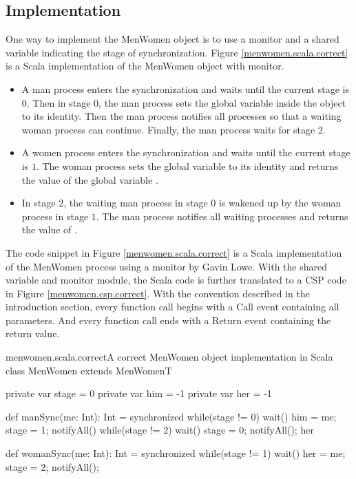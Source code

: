\documentclass{article}
\begin{document}
\subsection{Implementation}
One way to implement the MenWomen object is to use a monitor and a shared variable indicating the stage of synchronization. Figure \ref{menwomen.scala.correct} is a Scala implementation of the MenWomen object with monitor.
\begin{itemize}
  \item A man process enters the synchronization and waits until the current stage is $0$. Then in stage $0$, the man process sets the global variable  inside the  object to its identity. Then the man process notifies all processes so that a waiting woman process can continue. Finally, the man process waits for stage 2.
  \item A women process enters the synchronization and waits until the current stage is $1$. The woman process sets the global variable  to its identity and returns the value of the global variable .
  \item In stage $2$, the waiting man process in stage $0$ is wakened up by the woman process in stage $1$. The man process notifies all waiting processes and returns the value of .
\end{itemize}

The code snippet in Figure \ref{menwomen.scala.correct} is a Scala implementation of the MenWomen process using a monitor by Gavin Lowe. With the shared variable and monitor module, the Scala code is further translated to a CSP code in Figure \ref{menwomen.csp.correct}. With the convention described in the introduction section, every function call begins with a Call event containing all parameters. And every function call ends with a Return event containing the return value.

\begin{scalafloat}{menwomen.scala.correct}{A correct MenWomen object implementation in Scala}
class MenWomen extends MenWomenT{
  private var stage = 0
  private var him = -1
  private var her = -1

  def manSync(me: Int): Int = synchronized{
    while(stage != 0) wait()         
    him = me; stage = 1; notifyAll() 
    while(stage != 2) wait()
    stage = 0; notifyAll(); her
  }

  def womanSync(me: Int): Int = synchronized{
    while(stage != 1) wait()
    her = me; stage = 2; notifyAll();
  }
}
\end{scalafloat}
\end{document}
